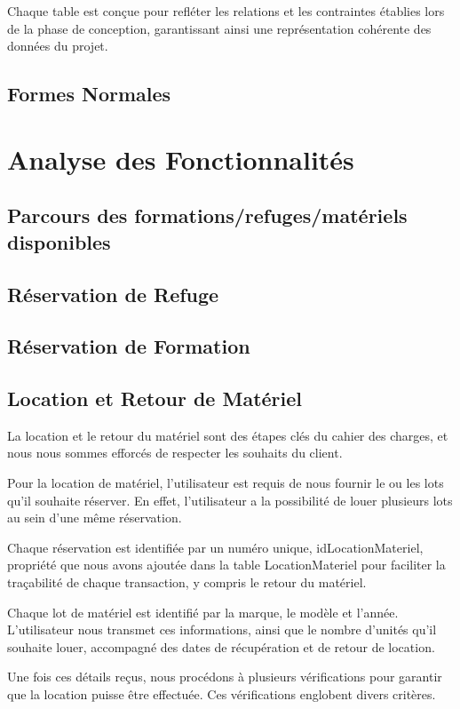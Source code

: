 Chaque table est conçue pour refléter les relations et les contraintes établies lors de la phase de conception, garantissant ainsi une représentation cohérente des données du projet.

\subsection{Formes Normales}

\section{Analyse des Fonctionnalités}

\subsection{Parcours des formations/refuges/matériels disponibles}
\subsection{Réservation de Refuge}
\subsection{Réservation de Formation}


\subsection{Location et Retour de Matériel}
La location et le retour du matériel sont des étapes clés du cahier des charges, et nous nous sommes efforcés de respecter les souhaits du client.

Pour la location de matériel, l'utilisateur est requis de nous fournir le ou les lots qu'il souhaite réserver. En effet, l'utilisateur a la possibilité de louer plusieurs lots au sein d'une même réservation.

 Chaque réservation est identifiée par un numéro unique, idLocationMateriel, propriété que nous avons ajoutée dans la table LocationMateriel pour faciliter la traçabilité de chaque transaction, y compris le retour du matériel.


Chaque lot de matériel est identifié par la marque, le modèle et l'année.  L'utilisateur nous transmet ces informations, ainsi que le nombre d'unités qu'il souhaite louer, accompagné des dates de récupération et de retour de location.  

Une fois ces détails reçus, nous procédons à plusieurs vérifications pour garantir que la location puisse être effectuée. Ces vérifications englobent divers critères.

